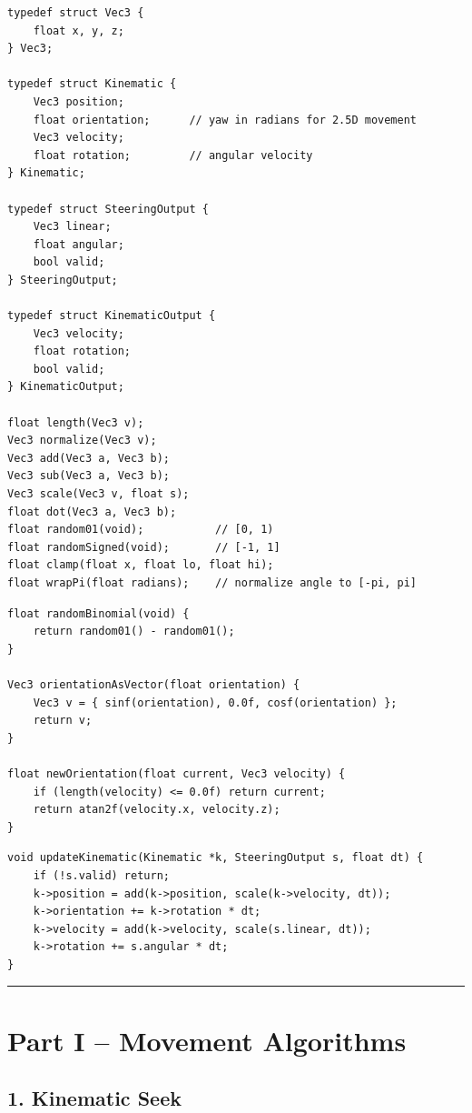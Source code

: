 \documentclass[10pt,letterpaper]{article}
\begin{document}
\begin{verbatim}
typedef struct Vec3 {
    float x, y, z;
} Vec3;

typedef struct Kinematic {
    Vec3 position;
    float orientation;      // yaw in radians for 2.5D movement
    Vec3 velocity;
    float rotation;         // angular velocity
} Kinematic;

typedef struct SteeringOutput {
    Vec3 linear;
    float angular;
    bool valid;
} SteeringOutput;

typedef struct KinematicOutput {
    Vec3 velocity;
    float rotation;
    bool valid;
} KinematicOutput;

float length(Vec3 v);
Vec3 normalize(Vec3 v);
Vec3 add(Vec3 a, Vec3 b);
Vec3 sub(Vec3 a, Vec3 b);
Vec3 scale(Vec3 v, float s);
float dot(Vec3 a, Vec3 b);
float random01(void);           // [0, 1)
float randomSigned(void);       // [-1, 1]
float clamp(float x, float lo, float hi);
float wrapPi(float radians);    // normalize angle to [-pi, pi]
\end{verbatim}

\begin{verbatim}
float randomBinomial(void) {
    return random01() - random01();
}

Vec3 orientationAsVector(float orientation) {
    Vec3 v = { sinf(orientation), 0.0f, cosf(orientation) };
    return v;
}

float newOrientation(float current, Vec3 velocity) {
    if (length(velocity) <= 0.0f) return current;
    return atan2f(velocity.x, velocity.z);
}
\end{verbatim}

\begin{verbatim}
void updateKinematic(Kinematic *k, SteeringOutput s, float dt) {
    if (!s.valid) return;
    k->position = add(k->position, scale(k->velocity, dt));
    k->orientation += k->rotation * dt;
    k->velocity = add(k->velocity, scale(s.linear, dt));
    k->rotation += s.angular * dt;
}
\end{verbatim}

\medskip\hrule\medskip

\clearpage
\section*{Part I -- Movement Algorithms}

\subsection*{1. Kinematic Seek}
{}
\end{document}
